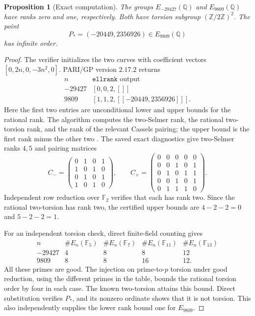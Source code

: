 \documentclass[11pt,a4paper]{article}
\newtheorem{proposition}[theorem]{Proposition}
\theoremstyle{definition}\newtheorem{definition}[theorem]{Definition}
\newcommand{\Q}{\mathbb Q}\newcommand{\Z}{\mathbb Z}
\newcommand{\F}{\mathbb F}
\begin{document}
\begin{proposition}[Exact computation]\label{prop:ranks}
The groups $E_{-29427}(\Q)$ and $E_{9809}(\Q)$ have ranks zero
and one, respectively.  Both have torsion subgroup
$(\Z/2\Z)^2$.  The point
\[
                      P_*=(-20449,2356926)\in E_{9809}(\Q)
\]
has infinite order.
\end{proposition}
\begin{proof}
The verifier initializes the two curves with coefficient vectors
$[0,2n,0,-3n^2,0]$.  PARI/GP version $2.17.2$ returns
\[
 \begin{array}{c|c}
 n&\texttt{ellrank}\text{ output}\\\hline
 -29427&[0,0,2,[]]\\
 9809&[1,1,2,[[-20449,2356926]]].
 \end{array}
\]
Here the first two entries are unconditional lower and upper bounds
for the rational rank.  The algorithm computes the two-Selmer rank,
the rational two-torsion rank, and the rank of the relevant Cassels
pairing; the upper bound is the first rank minus the other two
\cite{PARI}.  The saved exact diagnostics give two-Selmer ranks $4,5$
and pairing matrices
\[
 C_-=
 \begin{pmatrix}
 0&1&0&1\\1&0&1&0\\0&1&0&1\\1&0&1&0
 \end{pmatrix},\qquad
 C_+=
 \begin{pmatrix}
 0&0&0&0&0\\
 0&0&1&0&1\\
 0&1&0&1&1\\
 0&0&1&0&1\\
 0&1&1&1&0
 \end{pmatrix}.
\]
Independent row reduction over $\F_2$ verifies that each has rank
two.  Since the rational two-torsion has rank two, the certified
upper bounds are $4-2-2=0$ and $5-2-2=1$.

For an independent torsion check, direct finite-field counting gives
\[
 \begin{array}{c|rrrr}
 n&\#E_n(\F_5)&\#E_n(\F_7)&\#E_n(\F_{11})&\#E_n(\F_{13})\\\hline
 -29427&4&8&8&12\\
 9809&8&8&16&12.
 \end{array}
\]
All these primes are good.  The injection on prime-to-$p$ torsion
under good reduction, using the different primes in the table,
bounds the rational torsion order by four in each case.  The known
two-torsion attains this bound.  Direct substitution verifies $P_*$,
and its nonzero ordinate shows that it is not torsion.  This also
independently supplies the lower rank bound one for $E_{9809}$.
\end{proof}
\end{document}
